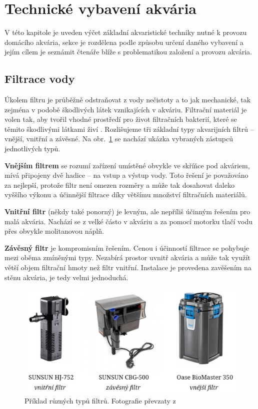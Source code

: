 \section{Technické vybavení akvária}
    V této kapitole je uveden výčet základní akvaristické techniky nutné k provozu domácího akvária, sekce je rozdělena podle způsobu určení daného vybavení a jejím cílem je seznámit čtenáře blíže s problematikou založení a provozu akvária.
    \subsection{Filtrace vody}
        Úkolem filtru je průběžně odstraňovat z vody nečistoty a to jak mechanické, tak zejména v podobě škodlivých látek vznikajících v akváriu. Filtrační materiál je volen tak, aby tvořil vhodné prostředí pro život filtračních bakterií, které se těmito škodlivými látkami živí \cite{yt-filtrace}. Rozlišujeme tři základní typy akvarijních filtrů -- vnější, vnitřní a závěsné. Na obr.~\ref{fig:filtry-srovnani} se nachází ukázka vybraných zástupců jednotlivých typů.
        
        \textbf{Vnějším filtrem} se rozumí zařízení umístěné obvykle ve skříňce pod akváriem, mívá připojeny dvě hadice -- na vstup a výstup vody. Toto řešení je považováno za nejlepší, protože filtr není omezen rozměry a může tak dosahovat daleko vyššího výkonu a účinnější filtrace díky většímu množství filtračních materiálů. 

        \textbf{Vnitřní filtr} (někdy také ponorný) je levným, ale nepříliš účinným řešením pro malá akvária. Nachází se z velké částo v akváriu a za pomocí motorku tlačí vodu přes obvykle molitanovou náplň.

        \textbf{Závěsný filtr}  je kompromisním řešením.  Cenou i účinností filtrace se pohybuje mezi oběma zmíněnými typy. Nezabírá prostor uvnitř akvária a může tak využít větší objem filtrační hmoty než filtr vnitřní. Instalace je provedena zavěšením na stěnu akvária, je tedy velmi jednoduchá. 

        \begin{figure}[h!]
            \centering
            \includegraphics[width=\textwidth]{obrazky/filtry/filtry.jpg}
            \caption{Příklad různých typů filtrů. Fotografie převzaty z \cite{eshop-rostlinna-akvaria}}
            \label{fig:filtry-srovnani}
        \end{figure}

